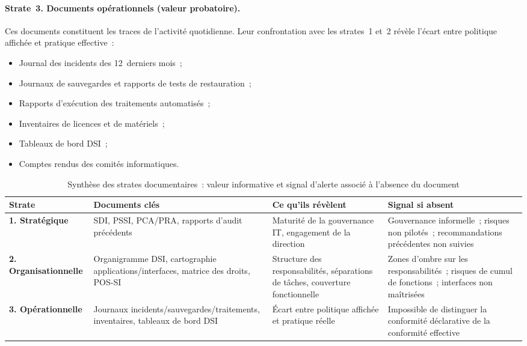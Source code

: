 \paragraph{Strate~3. Documents opérationnels (valeur probatoire).}
Ces documents constituent les traces de l'activité quotidienne. Leur confrontation avec
les strates~1 et~2 révèle l'écart entre politique affichée et pratique effective~:
\begin{itemize}
    \item Journal des incidents des 12~derniers mois~;
    \item Journaux de sauvegardes et rapports de tests de restauration~;
    \item Rapports d'exécution des traitements automatisés~;
    \item Inventaires de licences et de matériels~;
    \item Tableaux de bord DSI~;
    \item Comptes rendus des comités informatiques.
\end{itemize}

\begin{table}[H]
\centering
\small
\renewcommand{\arraystretch}{1.4}
\caption{Synthèse des strates documentaires~: valeur informative et signal d'alerte
associé à l'absence du document}
\label{tab:strates-docs}
\begin{tabular}{|p{1.6cm}|p{3.5cm}|p{3.5cm}|p{4cm}|}
    \hline
    \rowcolor{gray!20}
    \textbf{Strate} & \textbf{Documents clés} &
    \textbf{Ce qu'ils révèlent} &
    \textbf{Signal si absent} \\ \hline
    \textbf{1. Stratégique} &
    SDI, PSSI, PCA/PRA, rapports d'audit précédents &
    Maturité de la gouvernance IT, engagement de la direction &
    Gouvernance informelle~; risques non pilotés~;
    recommandations précédentes non suivies \\ \hline
    \textbf{2. Organisationnelle} &
    Organigramme DSI, cartographie applications/interfaces,
    matrice des droits, POS-SI &
    Structure des responsabilités, séparations de tâches,
    couverture fonctionnelle &
    Zones d'ombre sur les responsabilités~;
    risques de cumul de fonctions~;
    interfaces non maîtrisées \\ \hline
    \textbf{3. Opérationnelle} &
    Journaux incidents/sauvegardes/traitements,
    inventaires, tableaux de bord DSI &
    Écart entre politique affichée et pratique réelle &
    Impossible de distinguer la conformité déclarative
    de la conformité effective \\ \hline
\end{tabular}
\end{table}


